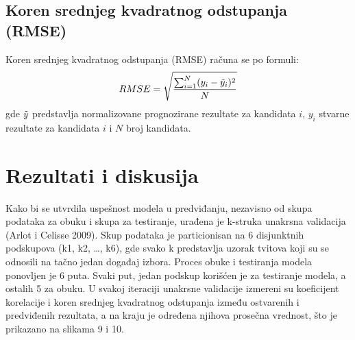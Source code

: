 \subsection{Koren srednjeg kvadratnog odstupanja (RMSE)}

Koren srednjeg kvadratnog odstupanja (RMSE) računa se po formuli:
\begin{equation*}
    RMSE = \sqrt{\frac{\sum^N_{i=1}(y_i - \Tilde{y}_i)^2}{N}}
\end{equation*}
gde $\Tilde{y}$ predstavlja normalizovane prognozirane rezultate za kandidata $i$, $y_i$ stvarne rezultate za
kandidata $i$ i $N$ broj kandidata.

\section{Rezultati i diskusija}

Kako bi se utvrdila uspešnost modela u predviđanju, nezavisno od skupa podataka za obuku i skupa za testiranje, urađena je k-struka unakrsna validacija (Arlot i Celisse 2009). Skup podataka je particionisan na 6 disjunktnih podskupova (k1, k2, …, k6), gde svako k predstavlja uzorak tvitova koji su se odnosili na tačno jedan događaj izbora. Proces obuke i testiranja modela ponovljen je 6 puta. Svaki put, jedan podskup korišćen je za testiranje modela, a ostalih 5 za obuku. U svakoj iteraciji unakrsne validacije izmereni su koeficijent korelacije i koren srednjeg kvadratnog odstupanja između ostvarenih i predviđenih rezultata, a na kraju je određena njihova prosečna vrednost, što je prikazano na slikama 9 i 10.

